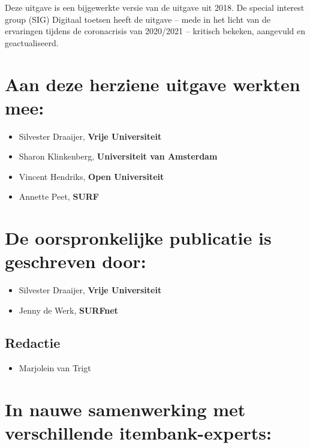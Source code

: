 \documentclass[
  letterpaper,
  DIV=11,
  numbers=noendperiod]{scrreprt}
\providecommand{\tightlist}{%
  \setlength{\itemsep}{0pt}\setlength{\parskip}{0pt}}\usepackage{longtable,booktabs,array}
\begin{document}
Deze uitgave is een bijgewerkte versie van de uitgave uit 2018. De
special interest group (SIG) Digitaal toetsen heeft de uitgave -- mede
in het licht van de ervaringen tijdens de coronacrisis van 2020/2021 --
kritisch bekeken, aangevuld en geactualiseerd.

\hypertarget{aan-deze-herziene-uitgave-werkten-mee}{%
\section{Aan deze herziene uitgave werkten
mee:}\label{aan-deze-herziene-uitgave-werkten-mee}}

\begin{itemize}
\tightlist
\item
  Silvester Draaijer, \textbf{Vrije Universiteit}
\item
  Sharon Klinkenberg, \textbf{Universiteit van Amsterdam}
\item
  Vincent Hendriks, \textbf{Open Universiteit}
\item
  Annette Peet, \textbf{SURF}
\end{itemize}

\hypertarget{de-oorspronkelijke-publicatie-is-geschreven-door}{%
\section{De oorspronkelijke publicatie is geschreven
door:}\label{de-oorspronkelijke-publicatie-is-geschreven-door}}

\begin{itemize}
\tightlist
\item
  Silvester Draaijer, \textbf{Vrije Universiteit}
\item
  Jenny de Werk, \textbf{SURFnet}
\end{itemize}

\hypertarget{redactie}{%
\subsection{Redactie}\label{redactie}}

\begin{itemize}
\tightlist
\item
  Marjolein van Trigt
\end{itemize}

\hypertarget{in-nauwe-samenwerking-met-verschillende-itembank-experts}{%
\section{In nauwe samenwerking met verschillende
itembank-experts:}\label{in-nauwe-samenwerking-met-verschillende-itembank-experts}}
\end{document}
